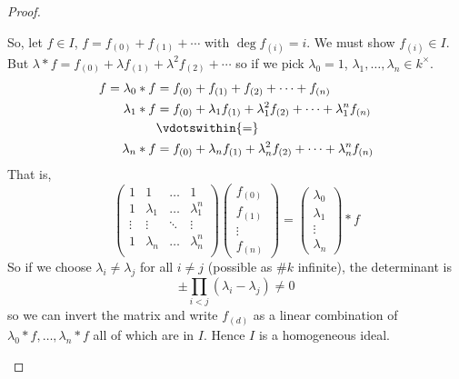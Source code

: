\documentclass{article}
\begin{document}
\begin{proof}
\begin{enumerate}[label=(\roman*)]
            So, let $f \in I$, $f = f_{(0)} + f_{(1)} + \dotsb$ with $\deg f_{(i)}  = i$. We must show $f_{(i)} \in I$.
            But $\lambda * f = f_{(0)} + \lambda f_{(1)} + \lambda^2 f_{(2)} + \dotsb$ so if we pick $\lambda_0 = 1$, $\lambda_1, \dotsc, \lambda_n \in k^\times$.
                \begin{align*} f = \lambda_0 * f &= f_{(0)} + f_{(1)} + f_{(2)} + \dotsb + f_{(n)} \\
                    \lambda_1 * f &= f_{(0)} + \lambda_1 f_{(1)} + \lambda_1^2 f_{(2)} + \dotsb + \lambda_1^n f_{(n)} \\
                                  &\vdotswithin{=}\\
                    \lambda_n * f &= f_{(0)} + \lambda_n f_{(1)} + \lambda_n^2 f_{(2)} + \dotsb + \lambda_n^n f_{(n)} \\
                \end{align*}
                That is,
                \begin{equation*}
                    \begin{pmatrix}
                        1 & 1 & \dots & 1 \\
                        1 & \lambda_1 & \dots & \lambda_1^n \\
                        \vdots & \vdots & \ddots & \vdots \\
                        1 & \lambda_n & \dots & \lambda_n^n \\
                    \end{pmatrix}
                    \begin{pmatrix}
                        f_{(0)} \\f_{(1)} \\ \vdots \\f_{(n)}
                    \end{pmatrix}
                    =
                    \begin{pmatrix}
                        \lambda_0 \\ \lambda_1 \\ \vdots \\ \lambda_n
                    \end{pmatrix}
                    * f
                \end{equation*}
                So if we choose $\lambda_i \neq \lambda_j$ for all $i \neq j$ (possible as $\#k$ infinite), the determinant is
                \begin{equation*}
                    \pm \prod_{i < j} (\lambda_i - \lambda_j) \neq 0
                \end{equation*}
                so we can invert the matrix and write $f_{(d)}$ as a linear combination of $\lambda_0 * f, \dotsc, \lambda_n * f$ all of which are in $I$.
                Hence $I$ is a homogeneous ideal. \qedhere
    \end{enumerate}
\end{proof}
\end{document}
